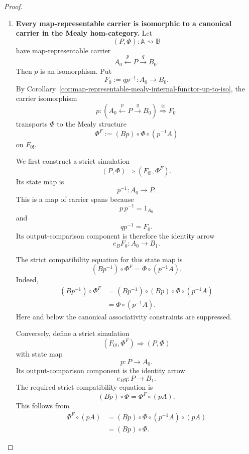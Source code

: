 \begin{proof}
\begin{enumerate}
        \item \textbf{Every map-representable carrier is isomorphic to a
        canonical carrier in the Mealy hom-category.}
        Let
        \[
            (P,\Phi):\mathbb A\rightsquigarrow\mathbb B
        \]
        have map-representable carrier
        \[
            A_0\xleftarrow{p}P\xrightarrow{q}B_0.
        \]
        Then \(p\) is an isomorphism. Put
        \[
            F_0:=qp^{-1}:A_0\to B_0.
        \]
        By
        Corollary~\ref{cor:map-representable-mealy-internal-functor-up-to-iso},
        the carrier isomorphism
        \[
            p:
            \left(
                A_0\xleftarrow{p}P\xrightarrow{q}B_0
            \right)
            \overset{\cong}{\Longrightarrow}
            F_{0!}
        \]
        transports \(\Phi\) to the Mealy structure
        \[
            \Phi^F
            :=
            (Bp)\circ\Phi\circ(p^{-1}A)
        \]
        on \(F_{0!}\).

        We first construct a strict simulation
        \[
            (P,\Phi)\Rightarrow(F_{0!},\Phi^F).
        \]
        Its state map is
        \[
            p^{-1}:A_0\to P.
        \]
        This is a map of carrier spans because
        \[
            p\,p^{-1}=1_{A_0}
        \]
        and
        \[
            qp^{-1}=F_0.
        \]
        Its output-comparison component is therefore the identity arrow
        \[
            e_BF_0:A_0\to B_1.
        \]

        The strict compatibility equation for this state map is
        \[
            (Bp^{-1})\circ\Phi^F
            =
            \Phi\circ(p^{-1}A).
        \]
        Indeed,
        \[
        \begin{aligned}
            (Bp^{-1})\circ\Phi^F
            &=
            (Bp^{-1})\circ
            (Bp)\circ
            \Phi\circ
            (p^{-1}A)
            \\
            &=
            \Phi\circ(p^{-1}A).
        \end{aligned}
        \]
        Here and below the canonical associativity constraints are suppressed.

        Conversely, define a strict simulation
        \[
            (F_{0!},\Phi^F)\Rightarrow(P,\Phi)
        \]
        with state map
        \[
            p:P\to A_0.
        \]
        Its output-comparison component is the identity arrow
        \[
            e_Bq:P\to B_1.
        \]
        The required strict compatibility equation is
        \[
            (Bp)\circ\Phi
            =
            \Phi^F\circ(pA).
        \]
        This follows from
        \[
        \begin{aligned}
            \Phi^F\circ(pA)
            &=
            (Bp)\circ
            \Phi\circ
            (p^{-1}A)\circ
            (pA)
            \\
            &=
            (Bp)\circ\Phi.
        \end{aligned}
        \]


\end{enumerate}
\end{proof}

